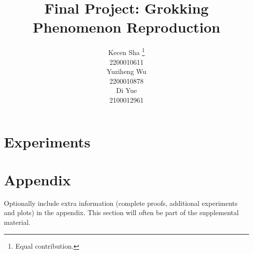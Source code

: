 \documentclass{article}
\title{Final Project: Grokking Phenomenon Reproduction}
\author{%
  Kecen Sha \thanks{Equal contribution.} \\
  2200010611\\
  \And
  Yuziheng Wu \footnotemark[1]\\
  2200010878 \\
  \And
  Di Yue \footnotemark[1]\\
  2100012961 \\
}
\theoremstyle{definition}
\begin{document}
\maketitle







\section{Experiments}









\begin{small}	
    
\end{small}




\appendix


\section{Appendix}


Optionally include extra information (complete proofs, additional experiments and plots) in the appendix.
This section will often be part of the supplemental material.
\end{document}
